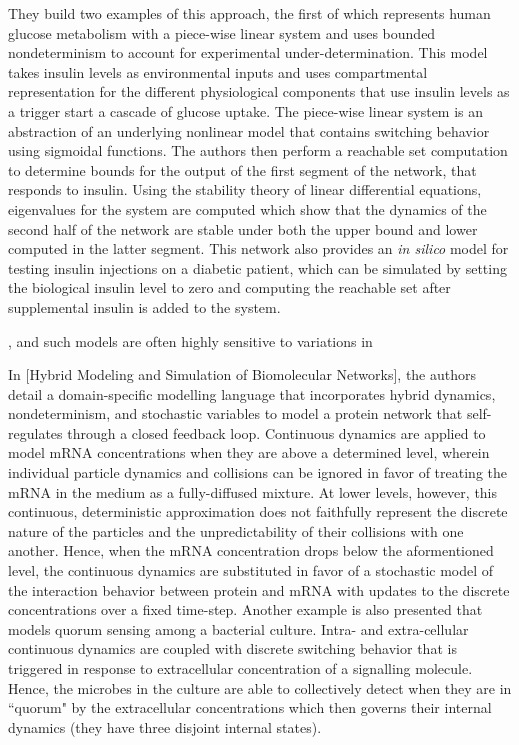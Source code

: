 They build two examples of this approach, the first of which represents human glucose metabolism with a piece-wise linear system and uses bounded nondeterminism to account for experimental under-determination. This model takes insulin levels as environmental inputs and uses compartmental representation for the different physiological components that use insulin levels as a trigger start a cascade of glucose uptake. The piece-wise linear system is an abstraction of an underlying nonlinear model that contains switching behavior using sigmoidal functions. The authors then perform a reachable set computation to determine bounds for the output of the first segment of the network, that responds to insulin. Using the stability theory of linear differential equations, eigenvalues for the system are computed which show that the dynamics of the second half of the network are stable under both the upper bound and lower computed in the latter segment. This network also provides an \textit{in silico} model for testing insulin injections on a diabetic patient, which can be simulated by setting the biological insulin level to zero and computing the reachable set after supplemental insulin is added to the system.

, and such models are often highly sensitive to variations in

In [Hybrid Modeling and Simulation of Biomolecular Networks], the authors detail a domain-specific modelling language that incorporates hybrid dynamics, nondeterminism, and stochastic variables to model a protein network that self-regulates through a closed feedback loop. Continuous dynamics are applied to model mRNA concentrations when they are above a determined level, wherein individual particle dynamics and collisions can be ignored in favor of treating the mRNA in the medium as a fully-diffused mixture. At lower levels, however, this continuous, deterministic approximation does not faithfully represent the discrete nature of the particles and the unpredictability of their collisions with one another. Hence, when the mRNA concentration drops below the aformentioned level, the continuous dynamics are substituted in favor of a stochastic model of the interaction behavior between protein and mRNA with updates to the discrete concentrations over a fixed time-step. Another example is also presented that models quorum sensing among a bacterial culture. Intra- and extra-cellular continuous dynamics are coupled with discrete switching behavior that is triggered in response to extracellular concentration of a signalling molecule. Hence, the microbes in the culture are able to collectively detect when they are in ``quorum" by the extracellular concentrations which then governs their internal dynamics (they have three disjoint internal states).


